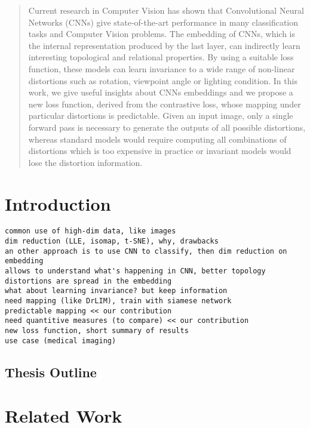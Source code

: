 \documentclass[a4paper,12pt]{report}
\begin{document}
\begin{abstract}
    Current research in Computer Vision has shown that Convolutional Neural Networks (CNNs) give state-of-the-art performance in many classification tasks and Computer Vision problems.
    The embedding of CNNs, which is the internal representation produced by the last layer, can indirectly learn interesting topological and relational properties.
    By using a suitable loss function, these models can learn invariance to a wide range of non-linear distortions such as rotation, viewpoint angle or lighting condition.
    In this work, we give useful insights about CNNs embeddings and we propose a new loss function, derived from the contrastive loss, whose mapping under particular distortions is predictable.
    Given an input image, only a single forward pass is necessary to generate the outputs of all possible distortions, whereas standard models would require computing all combinations of distortions which is too expensive in practice or invariant models would lose the distortion information.
\end{abstract}

\chapter{Introduction}
\begin{verbatim}
common use of high-dim data, like images
dim reduction (LLE, isomap, t-SNE), why, drawbacks
an other approach is to use CNN to classify, then dim reduction on embedding
allows to understand what's happening in CNN, better topology
distortions are spread in the embedding
what about learning invariance? but keep information
need mapping (like DrLIM), train with siamese network
predictable mapping << our contribution
need quantitive measures (to compare) << our contribution
new loss function, short summary of results
use case (medical imaging)
\end{verbatim}

\section{Thesis Outline}

\chapter{Related Work}
\end{document}
